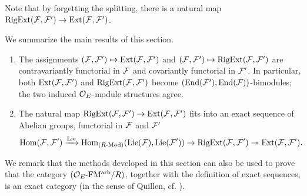 \documentclass[../main.tex]{subfiles}
\begin{document}
Note that by forgetting the splitting, there is a natural map 
$\operatorname {RigExt}(\mathcal{F}, \mathcal{F}') \to \operatorname{Ext}(\mathcal{F}, \mathcal{F}')$.

We summarize the main results of this section.

\begin{thm}\label{thm:MainResultsExtensions}
  \leavevmode \vspace{-0.5em}
  \begin{enumerate}
    \item The assignments $(\mathcal{F}, \mathcal{F}') \mapsto \operatorname{Ext}(\mathcal{F}, \mathcal{F}')$ and
      $(\mathcal{F}, \mathcal{F}') \mapsto \operatorname {RigExt}(\mathcal{F},\mathcal{F}')$ are contravariantly functorial
      in $\mathcal{F}$ and covariantly functorial in $\mathcal{F}'$.
      In particular, both $\operatorname{Ext}(\mathcal{F}, \mathcal{F}')$ and $\operatorname {RigExt}(\mathcal{F}, \mathcal{F}')$ become 
      $(\operatorname{End}(\mathcal{F}'), \operatorname{End}(\mathcal{F}))$-bimodules; the two induced $\mathcal{O}_E$-module structures
      agree.
    \item The natural map $\operatorname {RigExt}(\mathcal{F}, \mathcal{F}') \to \operatorname{Ext}(\mathcal{F}, \mathcal{F}')$ fits into an 
      exact sequence of Abelian groups, functorial in $\mathcal{F}$ and $\mathcal{F}'$
  \begin{equation*}
    \operatorname{Hom}(\mathcal{F}, \mathcal{F}') \xrightarrow{\operatorname{Lie}} \operatorname{Hom}_{{({R}\textnormal-\allowbreak\mathrm{Mod})}}(\operatorname{Lie}(\mathcal{F}), \operatorname{Lie}(\mathcal{F}')) \to \operatorname {RigExt}(\mathcal{F}, \mathcal{F}') \twoheadrightarrow
    \operatorname{Ext}(\mathcal{F}, \mathcal{F}'). 
  \end{equation*}
  \end{enumerate}
\end{thm}
We remark that the methods developed in this section can also be used to prove 
that the category ${({\mathcal{O}_E}\textnormal-\allowbreak\mathrm{FM^{arb}}/{R})}$, together with the definition of 
exact sequences, is an exact category (in the sense of Quillen, cf.
\cite{keller1990chain}). 
\end{document}

